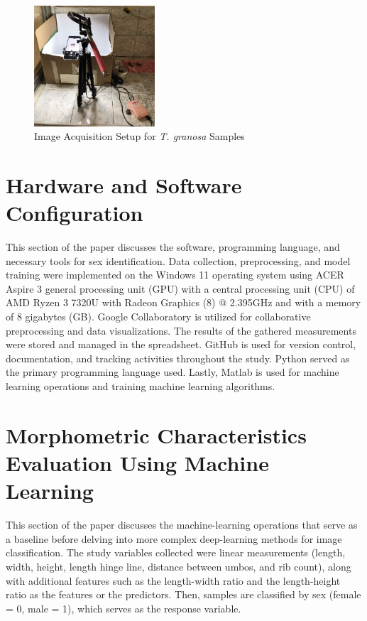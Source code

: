 \begin{figure}[!htbp]
	\centering
	\includegraphics[width=0.4\textwidth]{figures/setup.jpg}
	\caption{Image Acquisition Setup for \textit{T. granosa} Samples}
	\label{fig: setup}
\end{figure}

\section{Hardware and Software Configuration}
This section of the paper discusses the software, programming language, and necessary tools for sex identification. Data collection, preprocessing, and model training were implemented on the Windows 11 operating system using ACER Aspire 3 general processing unit (GPU) with a central processing unit (CPU) of  AMD Ryzen 3 7320U with Radeon Graphics (8) @ 2.395GHz and with a memory of 8 gigabytes (GB). 
Google Collaboratory is utilized for collaborative preprocessing and data visualizations. The results of the gathered measurements were stored and managed in the spreadsheet. GitHub is used for version control, documentation, and tracking activities throughout the study. Python served as the primary programming language used. Lastly, Matlab is used for machine learning operations and training machine learning algorithms. 


\section{Morphometric Characteristics Evaluation Using Machine Learning }
\label{sec:ml models}

This section of the paper discusses the machine-learning operations that serve as a baseline before delving into more complex deep-learning methods for image classification. The study variables collected were linear measurements (length, width, height, length hinge line, distance between umbos, and rib count), along with additional features such as the length-width ratio and the length-height ratio as the features or the predictors. Then, samples are classified by sex (female = 0, male = 1), which serves as the response variable. 

